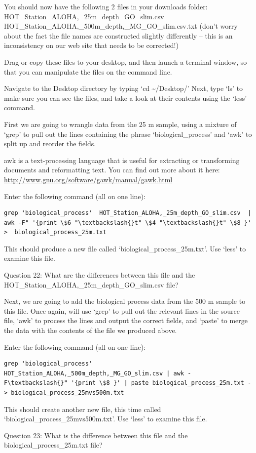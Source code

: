 You should now have the following 2 files in your downloads folder: HOT_Station_ALOHA,_25m_depth_GO_slim.csv
HOT_Station_ALOHA,_500m_depth,_MG_GO_slim.csv.txt
(don’t worry about the fact the file names are constructed slightly differently – this is an inconsistency on our web site that needs to be corrected!)

\begin{steps}
Drag or copy these files to your desktop, and then launch a terminal window, so that you can manipulate the files on the command line.
  
Navigate to the Desktop directory by typing ‘cd \textasciitilde{}/Desktop/’   Next, type ‘ls’ to make sure you can see the files, and take a look at their contents using the ‘less’ command.
\end{steps}

First we are going to wrangle data from the 25 m sample, using a mixture of ‘grep’ to pull out the lines containing the phrase ‘biological_process’ and ‘awk’ to split up and reorder the fields. 

awk is a text-processing language that is useful for extracting or transforming documents and reformatting text. You can find out more about it here: \url{http://www.gnu.org/software/gawk/manual/gawk.html}

\begin{steps}
Enter the following command (all on one line):
\begin{lstlisting}
grep 'biological_process'  HOT_Station_ALOHA,_25m_depth_GO_slim.csv  | awk -F" '{print \$6 "\textbackslash{}t" \$4 "\textbackslash{}t" \$8 }'  >  biological_process_25m.txt

\end{lstlisting}
This should produce a new file called ‘biological_process_25m.txt’. Use ‘less’ to examine this file.

Question 22: What are the differences between this file and the HOT_Station_ALOHA,_25m_depth_GO_slim.csv  file?

\end{steps}

Next, we are going to add the biological process data from the 500 m sample to this file.  Once again, will use ‘grep’ to pull out the relevant lines in the source file, ‘awk’ to process the lines and output the correct fields, and ‘paste’ to merge the data with the contents of the file we produced above.

\begin{steps}
Enter the following command (all on one line):
\begin{lstlisting}
grep 'biological_process' HOT_Station_ALOHA,_500m_depth,_MG_GO_slim.csv | awk -F\textbackslash{}" '{print \$8 }' | paste biological_process_25m.txt - > biological_process_25mvs500m.txt

\end{lstlisting}
This should create another new file, this time called ‘biological_process_25mvs500m.txt’. Use ‘less’ to examine this file.
  
Question 23: What is the difference between this file and the biological_process_25m.txt file?
\end{steps}


